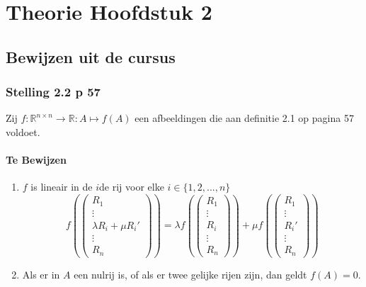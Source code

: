 \documentclass[lineaire_algebra_oplossingen.tex]{subfiles}
\begin{document}
\chapter{Theorie Hoofdstuk 2}
\section{Bewijzen uit de cursus}

\subsection{Stelling 2.2 p 57}
\label{2.2}
Zij $f : \mathbb{R}^{n\times n} \rightarrow \mathbb{R}:A\mapsto f(A)$ een afbeeldingen die aan definitie 2.1 op pagina 57 voldoet.

\subsubsection*{Te Bewijzen}
\begin{enumerate}
\item $f$ is lineair in de $i$de rij voor elke $i\in \{1,2,...,n\}$
\[
f\left(
\begin{pmatrix}
R_1 \\ \vdots \\ \lambda R_i + \mu R_i' \\ \vdots \\R_n
\end{pmatrix}
\right)
=
\lambda
f\left(
\begin{pmatrix}
R_1 \\ \vdots \\ R_i\\\vdots \\R_n
\end{pmatrix}
\right)
+
\mu 
f
\left(
\begin{pmatrix}
R_1 \\ \vdots \\ R_i' \\\vdots \\R_n
\end{pmatrix}
\right)
\] 
\item Als er in $A$ een nulrij is, of als er twee gelijke rijen zijn, dan geldt $f(A)=0$.
\end{enumerate}
\end{document}
